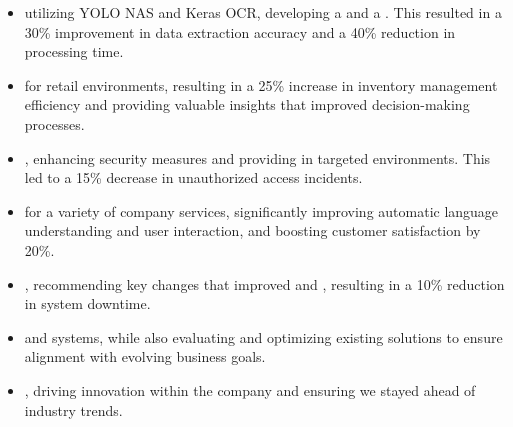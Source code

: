 
\begin{itemize}

  \item {} utilizing YOLO NAS and Keras OCR, developing a  and a . This resulted in a 30\% improvement in data extraction accuracy and a 40\% reduction in processing time.

  \item {} for retail environments, resulting in a 25\% increase in inventory management efficiency and providing valuable insights that improved decision-making processes.

  \item {}, enhancing security measures and providing  in targeted environments. This led to a 15\% decrease in unauthorized access incidents.

  \item {} for a variety of company services, significantly improving automatic language understanding and user interaction, and boosting customer satisfaction by 20\%.

  \item {}, recommending key changes that improved  and , resulting in a 10\% reduction in system downtime.

  \item {} and systems, while also evaluating and optimizing existing solutions to ensure alignment with evolving business goals.

  \item {}, driving innovation within the company and ensuring we stayed ahead of industry trends.


\end{itemize}
